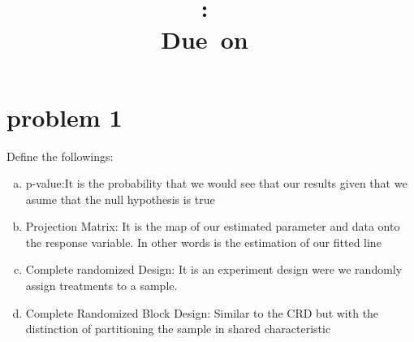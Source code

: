 \documentclass{article}
\title{
	\vspace{2in}
	\textmd{\textbf{\hmwkClass:\ \hmwkTitle}}\\
	\normalsize\vspace{0.1in}\small{Due\ on\ \hmwkDueDate}\\
	\vspace{0.1in}\large{\textit{\hmwkClassInstructor}}
	\vspace{3in}
}
\author{\hmwkAuthorName}
\date{}
\begin{document}
\maketitle
\pagebreak
\tableofcontents
\pagebreak

\section{problem 1}
Define the followings:
\begin{enumerate}[(a)]
	\item p-value:It is the probability that we would see that our results given that we asume that the null hypothesis is true
	\item Projection Matrix: It is the map of our estimated parameter and data onto the response variable. In other words is the
	      estimation of our fitted line
	\item Complete randomized Design: It is an experiment design were we randomly assign treatments to a sample.
	\item Complete Randomized Block Design: Similar to the CRD but with the distinction of partitioning the sample in shared characteristic

\end{enumerate}
\end{document}
